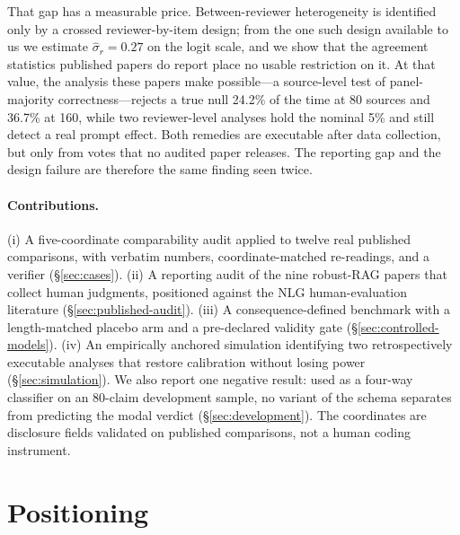 \documentclass[11pt]{article}
\begin{document}
That gap has a measurable price. Between-reviewer heterogeneity is identified
only by a crossed reviewer-by-item design; from the one such design available
to us we estimate $\hat\sigma_r=0.27$ on the logit scale, and we show that the
agreement statistics published papers do report place no usable restriction on
it. At that value, the analysis these papers make possible---a source-level
test of panel-majority correctness---rejects a true null 24.2\% of the time at
80 sources and 36.7\% at 160, while two reviewer-level analyses hold the
nominal 5\% and still detect a real prompt effect. Both remedies are
executable after data collection, but only from votes that no audited paper
releases. The reporting gap and the design failure are therefore the same
finding seen twice.

\paragraph{Contributions.}
(i) A five-coordinate comparability audit applied to twelve real published
comparisons, with verbatim numbers, coordinate-matched re-readings, and a
verifier (\S\ref{sec:cases}). (ii) A reporting audit of the nine robust-RAG
papers that collect human judgments, positioned against the NLG
human-evaluation literature (\S\ref{sec:published-audit}). (iii) A
consequence-defined benchmark with a length-matched placebo arm and a
pre-declared validity gate (\S\ref{sec:controlled-models}). (iv) An
empirically anchored simulation identifying two retrospectively executable
analyses that restore calibration without losing power
(\S\ref{sec:simulation}). We also report one negative result: used as a
four-way classifier on an 80-claim development sample, no variant of the
schema separates from predicting the modal verdict
(\S\ref{sec:development}). The coordinates are disclosure fields validated on
published comparisons, not a human coding instrument.

\section{Positioning}
\label{sec:related}
\end{document}
